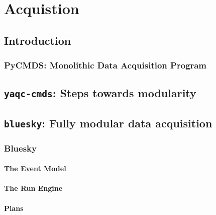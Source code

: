 \chapter{Acquistion} \label{cha:acq}

\newcommand\biab{\texttt{bluesky-in-a-box} }
\newcommand\yaq{\texttt{yaq} }
\newcommand\wrightfakes{\texttt{wright-fakes} }
\newcommand\wrightplans{\texttt{wright-plans} }

\clearpage

\section{Introduction}  %

\subsection{PyCMDS: Monolithic Data Acquisition Program}

\clearpage

\section{\texttt{yaqc-cmds}: Steps towards modularity}  %

\section{\texttt{bluesky}: Fully modular data acquisition}  %

\subsection{Bluesky}

\subsubsection{The Event Model}

\subsubsection{The Run Engine}

\subsubsection{Plans}

